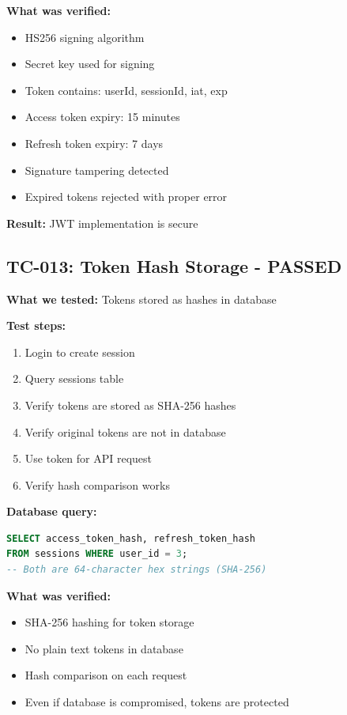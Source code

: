 \documentclass[11pt,a4paper]{article}
\begin{document}
\textbf{What was verified:}
\begin{itemize}
    \item HS256 signing algorithm
    \item Secret key used for signing
    \item Token contains: userId, sessionId, iat, exp
    \item Access token expiry: 15 minutes
    \item Refresh token expiry: 7 days
    \item Signature tampering detected
    \item Expired tokens rejected with proper error
\end{itemize}

\textbf{Result:} JWT implementation is secure

\subsection{TC-013: Token Hash Storage - PASSED}
\textbf{What we tested:} Tokens stored as hashes in database

\textbf{Test steps:}
\begin{enumerate}
    \item Login to create session
    \item Query sessions table
    \item Verify tokens are stored as SHA-256 hashes
    \item Verify original tokens are not in database
    \item Use token for API request
    \item Verify hash comparison works
\end{enumerate}

\textbf{Database query:}
\begin{lstlisting}[language=sql]
SELECT access_token_hash, refresh_token_hash 
FROM sessions WHERE user_id = 3;
-- Both are 64-character hex strings (SHA-256)
\end{lstlisting}

\textbf{What was verified:}
\begin{itemize}
    \item SHA-256 hashing for token storage
    \item No plain text tokens in database
    \item Hash comparison on each request
    \item Even if database is compromised, tokens are protected
\end{itemize}
\end{document}
